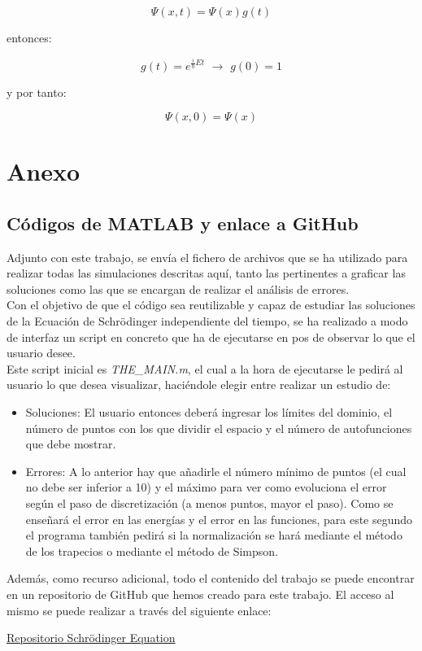 \documentclass[12pt]{article}
\begin{document}
\[
    \Psi(x,t)=\Psi(x)g(t)
    \]

entonces:

\[
    g(t)=e^{\frac{i}{\hbar}Et} \,\,\rightarrow\,\, g(0)=1
\]

y por tanto:

\[
    \Psi(x,0)=\Psi(x)
\]




\newpage
\section{Anexo}
\subsection{Códigos de MATLAB y enlace a GitHub}
Adjunto con este trabajo, se envía el fichero de archivos que se ha utilizado para realizar todas las simulaciones descritas aquí, tanto las pertinentes a graficar las soluciones como las que se encargan de realizar el análisis de errores.\\

Con el objetivo de que el código sea reutilizable y capaz de estudiar las soluciones de la Ecuación de Schrödinger independiente del tiempo, se ha realizado a modo de interfaz un script en concreto que ha de ejecutarse en pos de observar lo que el usuario desee.\\

Este script inicial es \textit{THE\_MAIN.m}, el cual a la hora de ejecutarse le pedirá al usuario lo que desea visualizar, haciéndole elegir entre realizar un estudio de:

\begin{itemize}
    \item Soluciones: El usuario entonces deberá ingresar los límites del dominio, el número de puntos con los que dividir el espacio y el número de autofunciones que debe mostrar.

    \item Errores: A lo anterior hay que añadirle el número mínimo de puntos (el cual no debe ser inferior a 10) y el máximo para ver como evoluciona el error según el paso de discretización (a menos puntos, mayor el paso). Como se enseñará el error en las energías y el error en las funciones, para este segundo el programa también pedirá si la normalización se hará mediante el método de los trapecios o mediante el método de Simpson.

\end{itemize}

Además, como recurso adicional, todo el contenido del trabajo se puede encontrar en un repositorio de GitHub que hemos creado para este trabajo. El acceso al mismo se puede realizar a través del siguiente enlace:

\begin{center}
    \href{https://github.com/JavierZeta/Schrodinguer-equation-}{Repositorio Schrödinger Equation}
\end{center}

\nocite{*}
\printbibliography
\end{document}
